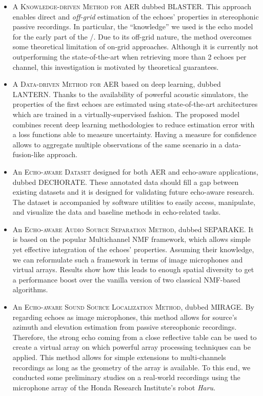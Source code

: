 \begin{itemize}

    \item A \textsc{Knowledge-driven Method for AER} dubbed \acs{BLASTER}.
    This approach enables direct and \textit{off-grid} estimation of the echoes' properties in stereophonic passive recordings.
    In particular, the ``knowledge'' we used is the echo model for the early part of the \RIRs/.
    Due to its off-grid nature, the method overcomes some theoretical limitation of on-grid approaches.
    Although it is currently not outperforming the state-of-the-art when retrieving more than 2 echoes per channel, this investigation is motivated by theoretical guarantees.

    \item A \textsc{Data-driven Method for AER} based on deep learning, dubbed \acs{LANTERN}.
    Thanks to the availability of powerful acoustic simulators, the properties of the first echoes are estimated using state-of-the-art architectures which are trained in a virtually-supervised fashion.
    The proposed model combines recent deep learning methodologies to reduce estimation error with a loss functions able to measure uncertainty.
    Having a measure for confidence allows to aggregate multiple observations of the same scenario in a data-fusion-like approach.

    \item An \textsc{Echo-aware Dataset} designed for both AER and echo-aware applications, dubbed \acs{DECHORATE}.
    These annotated data should fill a gap between existing datasets and it is designed for validating future echo-aware research.
    The dataset is accompanied by software utilities to easily access, manipulate, and visualize the data and baseline methods in echo-related tasks.

    \item An \textsc{Echo-aware Audio Source Separation Method}, dubbed \acs{SEPARAKE}.
    It is based on the popular Multichannel NMF framework, which allows simple yet effective integration of the echoes' properties.
    Assuming their knowledge, we can reformulate such a framework in terms of image microphones and virtual arrays.
    Results show how this leads to enough spatial diversity to get a performance boost over the vanilla version of two classical NMF-based algorithms.

    \item An \textsc{Echo-aware Sound Source Localization Method}, dubbed \acs{MIRAGE}.
    By regarding echoes as image microphones, this method allows for source's azimuth and elevation estimation from passive stereophonic recordings.
    Therefore, the strong echo coming from a close reflective table can be used to create a virtual array on which powerful array processing techniques can be applied.
    This method allows for simple extensions to multi-channels recordings as long as the geometry of the array is available.
    To this end, we conducted some preliminary studies on a real-world recordings using the microphone array of the Honda Research Institute's robot \textit{Haru}.


\end{itemize}
